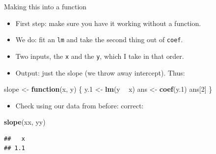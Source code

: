 \documentclass[ignorenonframetext,]{beamer}
\newenvironment{Shaded}{\begin{snugshade}}{\end{snugshade}}
\newcommand{\ControlFlowTok}[1]{\textcolor[rgb]{0.13,0.29,0.53}{\textbf{#1}}}
\newcommand{\DecValTok}[1]{\textcolor[rgb]{0.00,0.00,0.81}{#1}}
\newcommand{\FloatTok}[1]{\textcolor[rgb]{0.00,0.00,0.81}{#1}}
\newcommand{\KeywordTok}[1]{\textcolor[rgb]{0.13,0.29,0.53}{\textbf{#1}}}
\newcommand{\NormalTok}[1]{#1}
\newcommand{\OperatorTok}[1]{\textcolor[rgb]{0.81,0.36,0.00}{\textbf{#1}}}
\newcommand{\StringTok}[1]{\textcolor[rgb]{0.31,0.60,0.02}{#1}}
\providecommand{\tightlist}{%
  \setlength{\itemsep}{0pt}\setlength{\parskip}{0pt}}
\begin{document}
\begin{frame}[fragile]{Making this into a function}
\protect\hypertarget{making-this-into-a-function}{}

\begin{itemize}
\tightlist
\item
  First step: make sure you have it working without a function.
\item
  We do: fit an \texttt{lm} and take the second thing out of
  \texttt{coef}.
\item
  Two inputs, the \texttt{x} and the \texttt{y}, which I take in that
  order.
\item
  Output: just the slope (we throw away intercept). Thus:
\end{itemize}

\begin{Shaded}
\begin{Highlighting}[]
\NormalTok{slope <-}\StringTok{ }\ControlFlowTok{function}\NormalTok{(x, y) \{}
\NormalTok{  y}\FloatTok{.1}\NormalTok{ <-}\StringTok{ }\KeywordTok{lm}\NormalTok{(y }\OperatorTok{~}\StringTok{ }\NormalTok{x)}
\NormalTok{  ans <-}\StringTok{ }\KeywordTok{coef}\NormalTok{(y}\FloatTok{.1}\NormalTok{)}
\NormalTok{  ans[}\DecValTok{2}\NormalTok{]}
\NormalTok{\}}
\end{Highlighting}
\end{Shaded}

\begin{itemize}
\tightlist
\item
  Check using our data from before: correct:
\end{itemize}

\begin{Shaded}
\begin{Highlighting}[]
\KeywordTok{slope}\NormalTok{(xx, yy)}
\end{Highlighting}
\end{Shaded}

\begin{verbatim}
##   x 
## 1.1
\end{verbatim}

\end{frame}
\end{document}
